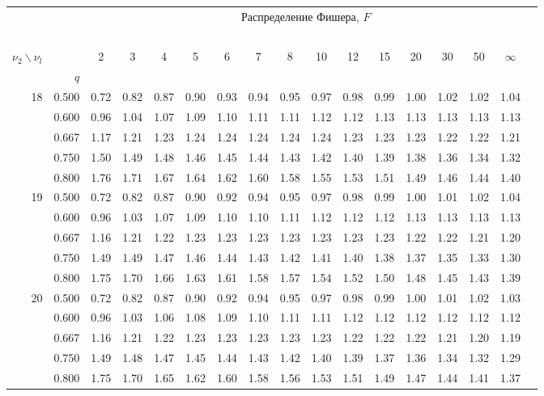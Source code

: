 \documentclass[pdftex,11pt,openany]{book}\usepackage[]{graphicx}\usepackage[]{color}
\begin{document}
{\begin{center}
\begin{tabular}{rrr@{\,}r@{\,}r@{\,}r@{\,}r@{\,}r@{\,}r@{\,}r
                   @{\,}r@{\,}r@{\,}r@{\,}r@{\,}r@{\,}r@{\,}r}
&&\multicolumn{14}{c}{Распределение Фишера, $F$}\\
\ \\
$\nu_2\backslash\nu_l$ & & 
\multicolumn{1}{c}{2} &\multicolumn{1}{c}{3} &
\multicolumn{1}{c}{4} &\multicolumn{1}{c}{5} &
\multicolumn{1}{c}{6} &\multicolumn{1}{c}{7} &
\multicolumn{1}{c}{8} &\multicolumn{1}{c}{10}&
\multicolumn{1}{c}{12}&\multicolumn{1}{c}{15}&
\multicolumn{1}{c}{20}&\multicolumn{1}{c}{30}&
\multicolumn{1}{c}{50}&\multicolumn{1}{c}{$\infty$}\\
& $q$ \\
18&0.500&0.72&0.82&0.87&0.90&0.93&0.94&0.95&0.97&0.98&0.99&1.00&1.02&1.02&1.04\\
  &0.600&0.96&1.04&1.07&1.09&1.10&1.11&1.11&1.12&1.12&1.13&1.13&1.13&1.13&1.13\\
  &0.667&1.17&1.21&1.23&1.24&1.24&1.24&1.24&1.24&1.23&1.23&1.23&1.22&1.22&1.21\\
  &0.750&1.50&1.49&1.48&1.46&1.45&1.44&1.43&1.42&1.40&1.39&1.38&1.36&1.34&1.32\\
  &0.800&1.76&1.71&1.67&1.64&1.62&1.60&1.58&1.55&1.53&1.51&1.49&1.46&1.44&1.40\\
19&0.500&0.72&0.82&0.87&0.90&0.92&0.94&0.95&0.97&0.98&0.99&1.00&1.01&1.02&1.04\\
  &0.600&0.96&1.03&1.07&1.09&1.10&1.10&1.11&1.12&1.12&1.12&1.13&1.13&1.13&1.13\\
  &0.667&1.16&1.21&1.22&1.23&1.23&1.23&1.23&1.23&1.23&1.23&1.22&1.22&1.21&1.20\\
  &0.750&1.49&1.49&1.47&1.46&1.44&1.43&1.42&1.41&1.40&1.38&1.37&1.35&1.33&1.30\\
  &0.800&1.75&1.70&1.66&1.63&1.61&1.58&1.57&1.54&1.52&1.50&1.48&1.45&1.43&1.39\\
20&0.500&0.72&0.82&0.87&0.90&0.92&0.94&0.95&0.97&0.98&0.99&1.00&1.01&1.02&1.03\\
  &0.600&0.96&1.03&1.06&1.08&1.09&1.10&1.11&1.11&1.12&1.12&1.12&1.12&1.12&1.12\\
  &0.667&1.16&1.21&1.22&1.23&1.23&1.23&1.23&1.23&1.22&1.22&1.22&1.21&1.20&1.19\\
  &0.750&1.49&1.48&1.47&1.45&1.44&1.43&1.42&1.40&1.39&1.37&1.36&1.34&1.32&1.29\\
  &0.800&1.75&1.70&1.65&1.62&1.60&1.58&1.56&1.53&1.51&1.49&1.47&1.44&1.41&1.37\\

\end{tabular}
\end{center}}
\end{document}

